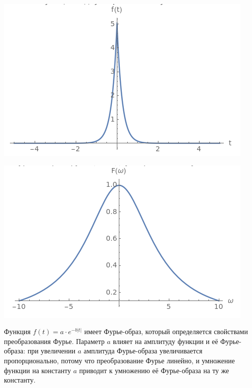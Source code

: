 \documentclass[a4paper,12pt]{article}
\begin{document}
\begin{center}
\begin{minipage}{0.48\textwidth}
  \centering
  \includegraphics[width=\linewidth]{images/5f54.png}
\end{minipage}
\hfill
\begin{minipage}{0.48\textwidth}
  \centering
  \includegraphics[width=\linewidth]{images/5F54.png}
\end{minipage}
\end{center}

Функция \( f(t) = a \cdot e^{-b |t|} \) имеет Фурье-образ, который определяется свойствами преобразования Фурье. Параметр \( a \) влияет на амплитуду функции и её Фурье-образа: при увеличении \( a \) амплитуда Фурье-образа увеличивается пропорционально, потому что преобразование Фурье линейно, и умножение функции на константу \( a \) приводит к умножению её Фурье-образа на ту же константу.
\end{document}
